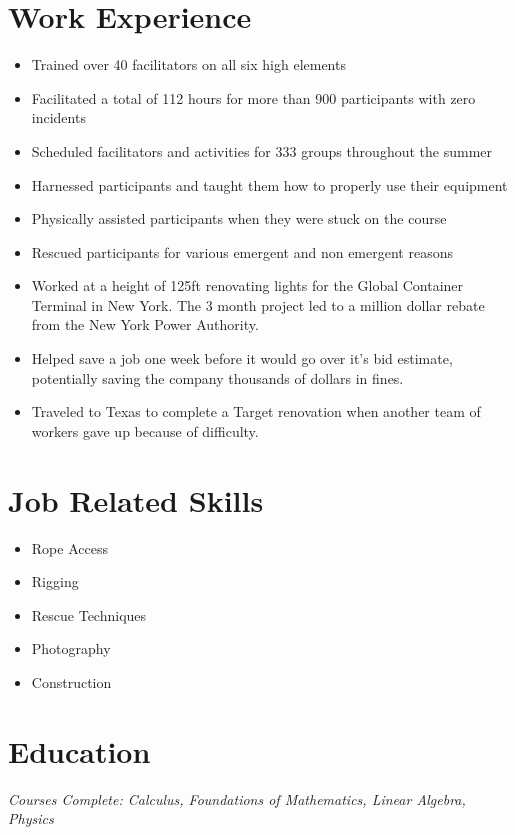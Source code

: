 \documentclass{my_resume}
\begin{document}
	
	\section{Work Experience}
	
			\begin{itemize}
				\item Trained over 40 facilitators on all six high elements
				\item Facilitated a total of 112 hours for more than 900 participants with zero incidents
				\item Scheduled facilitators and activities for 333 groups throughout the summer
			\end{itemize}
	
			\begin{itemize}
				\item Harnessed participants and taught them how to properly use their equipment
				\item Physically assisted participants when they were stuck on the course
				\item Rescued participants for various emergent and non emergent reasons
			\end{itemize}
	
			\begin{itemize}
				\item Worked at a height of 125ft renovating lights for the Global Container Terminal in New York. The 3 month project led to a million dollar rebate from the New York Power Authority.
				\item Helped save a job one week before it would go over it's bid estimate, potentially saving the company thousands of dollars in fines.
				\item Traveled to Texas to complete a Target renovation when another team of workers gave up because of difficulty.
			\end{itemize}

	\section{Job Related Skills}
		\begin{itemize}
			\item Rope Access
			\item Rigging
			\item Rescue Techniques
			\item Photography
			\item Construction
		\end{itemize}
	
	\section{Education}
		\scriptsize{\textit{Courses Complete: Calculus, Foundations of Mathematics, Linear Algebra, Physics}}
\end{document}
